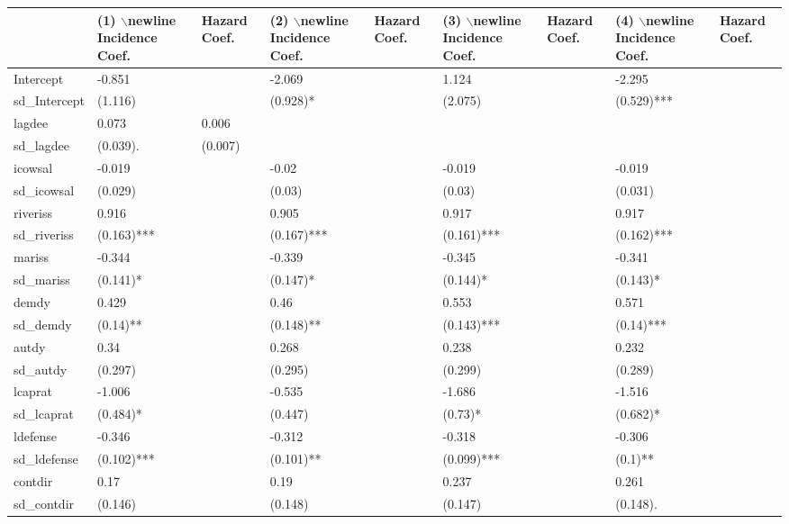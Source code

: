 \begin{table}[ht]
\centering
\begin{tabular}{lllllllll}
  \hline
  & (1) $\backslash$newline Incidence Coef. &  Hazard Coef. & (2) $\backslash$newline Incidence Coef. &  Hazard Coef. & (3) $\backslash$newline Incidence Coef. &  Hazard Coef. & (4) $\backslash$newline Incidence Coef. &  Hazard Coef. \\ 
  \hline
Intercept & -0.851 &  & -2.069 &  & 1.124 &  & -2.295 &  \\ 
  sd\_Intercept & (1.116)  &  & (0.928)* &  & (2.075)  &  & (0.529)*** &  \\ 
  lagdee & 0.073 & 0.006 &  &  &  &  &  &  \\ 
  sd\_lagdee & (0.039). & (0.007)  &  &  &  &  &  &  \\ 
  icowsal & -0.019 &  & -0.02 &  & -0.019 &  & -0.019 &  \\ 
  sd\_icowsal & (0.029)  &  & (0.03)  &  & (0.03)  &  & (0.031)  &  \\ 
  riveriss & 0.916 &  & 0.905 &  & 0.917 &  & 0.917 &  \\ 
  sd\_riveriss & (0.163)*** &  & (0.167)*** &  & (0.161)*** &  & (0.162)*** &  \\ 
  mariss & -0.344 &  & -0.339 &  & -0.345 &  & -0.341 &  \\ 
  sd\_mariss & (0.141)* &  & (0.147)* &  & (0.144)* &  & (0.143)* &  \\ 
  demdy & 0.429 &  & 0.46 &  & 0.553 &  & 0.571 &  \\ 
  sd\_demdy & (0.14)** &  & (0.148)** &  & (0.143)*** &  & (0.14)*** &  \\ 
  autdy & 0.34 &  & 0.268 &  & 0.238 &  & 0.232 &  \\ 
  sd\_autdy & (0.297)  &  & (0.295)  &  & (0.299)  &  & (0.289)  &  \\ 
  lcaprat & -1.006 &  & -0.535 &  & -1.686 &  & -1.516 &  \\ 
  sd\_lcaprat & (0.484)* &  & (0.447)  &  & (0.73)* &  & (0.682)* &  \\ 
  ldefense & -0.346 &  & -0.312 &  & -0.318 &  & -0.306 &  \\ 
  sd\_ldefense & (0.102)*** &  & (0.101)** &  & (0.099)*** &  & (0.1)** &  \\ 
  contdir & 0.17 &  & 0.19 &  & 0.237 &  & 0.261 &  \\ 
  sd\_contdir & (0.146)  &  & (0.148)  &  & (0.147)  &  & (0.148). &  \\ 

\end{tabular}
\end{table}
